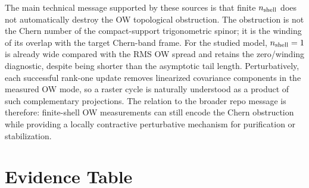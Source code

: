\documentclass[aps,prb,onecolumn,nofootinbib,superscriptaddress]{revtex4-2}
\begin{document}
The main technical message supported by these sources is that finite $n_{\rm shell}$ does not automatically destroy the OW topological obstruction.  The obstruction is not the Chern number of the compact-support trigonometric spinor; it is the winding of its overlap with the target Chern-band frame.  For the studied model, $n_{\rm shell}=1$ is already wide compared with the RMS OW spread and retains the zero/winding diagnostic, despite being shorter than the asymptotic tail length.  Perturbatively, each successful rank-one update removes linearized covariance components in the measured OW mode, so a raster cycle is naturally understood as a product of such complementary projections.  The relation to the broader repo message is therefore: finite-shell OW measurements can still encode the Chern obstruction while providing a locally contractive perturbative mechanism for purification or stabilization.

\section{Evidence Table}
\end{document}
